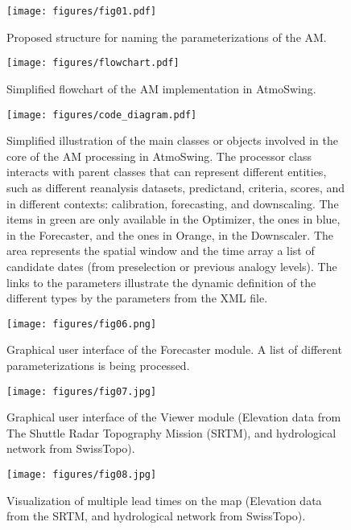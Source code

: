 \documentclass[review]{elsarticle}
\begin{document}
\begin{figure}[t]
	\texttt{[image: figures/fig01.pdf]}
	\caption{Proposed structure for naming the parameterizations of the AM.}
	\label{figure:nomenclature}
\end{figure}

\begin{figure}[t]
	\texttt{[image: figures/flowchart.pdf]}
	\caption{Simplified flowchart of the AM implementation in AtmoSwing.}
	\label{figure:flowchart_modules_atmoswing}
\end{figure}

\begin{figure*}[t]
	\texttt{[image: figures/code\_diagram.pdf]}
	\caption{Simplified illustration of the main classes or objects involved in the core of the AM processing in AtmoSwing. The processor class interacts with parent classes that can represent different entities, such as different reanalysis datasets, predictand, criteria, scores, and in different contexts: calibration, forecasting, and downscaling. The items in green are only available in the Optimizer, the ones in blue, in the Forecaster, and the ones in Orange, in the Downscaler. The area represents the spatial window and the time array a list of candidate dates (from preselection or previous analogy levels). The links to the parameters illustrate the dynamic definition of the different types by the parameters from the XML file.}
	\label{figure:code_diagram}
\end{figure*}

\begin{figure}[t]
	\texttt{[image: figures/fig06.png]}
	\caption{Graphical user interface of the Forecaster module. A list of different parameterizations is being processed.}
	\label{figure:atmoswing-forecaster-gui}
\end{figure}

\begin{figure*}[t]
	\texttt{[image: figures/fig07.jpg]}
	\caption{Graphical user interface of the Viewer module (Elevation data from The Shuttle Radar Topography Mission (SRTM), and hydrological network from SwissTopo).}
	\label{figure:atmoswing-viewer-gui}
\end{figure*}

\begin{figure*}[t]
	\texttt{[image: figures/fig08.jpg]}
	\caption{Visualization of multiple lead times on the map (Elevation data from the SRTM, and hydrological network from SwissTopo).}
	\label{figure:atmoswing-viewer-snail}
\end{figure*}
\end{document}
